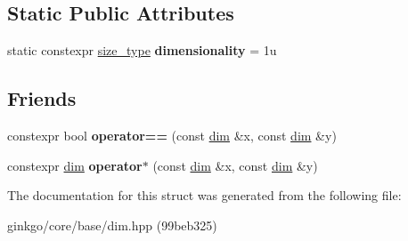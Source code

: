\subsection*{Static Public Attributes}
\begin{DoxyCompactItemize}
\item 
\mbox{\label{structgko_1_1dim_3_011u_00_01DimensionType_01_4_af991219c5c0f3b362f205a239767f3a3}} 
static constexpr \hyperlink{namespacegko_a6e5c95df0ae4e47aab2f604a22d98ee7}{size\+\_\+type} {\bfseries dimensionality} = 1u
\end{DoxyCompactItemize}
\subsection*{Friends}
\begin{DoxyCompactItemize}
\item 
\mbox{\label{structgko_1_1dim_3_011u_00_01DimensionType_01_4_a5e2c1e99f1c12540aac8489127c5dfb6}} 
constexpr bool {\bfseries operator==} (const \hyperlink{structgko_1_1dim}{dim} \&x, const \hyperlink{structgko_1_1dim}{dim} \&y)
\item 
\mbox{\label{structgko_1_1dim_3_011u_00_01DimensionType_01_4_a27d25e410396817b4ceafbae3d5df5c8}} 
constexpr \hyperlink{structgko_1_1dim}{dim} {\bfseries operator$\ast$} (const \hyperlink{structgko_1_1dim}{dim} \&x, const \hyperlink{structgko_1_1dim}{dim} \&y)
\end{DoxyCompactItemize}


The documentation for this struct was generated from the following file\+:\begin{DoxyCompactItemize}
\item 
ginkgo/core/base/dim.\+hpp (99beb325)\end{DoxyCompactItemize}
